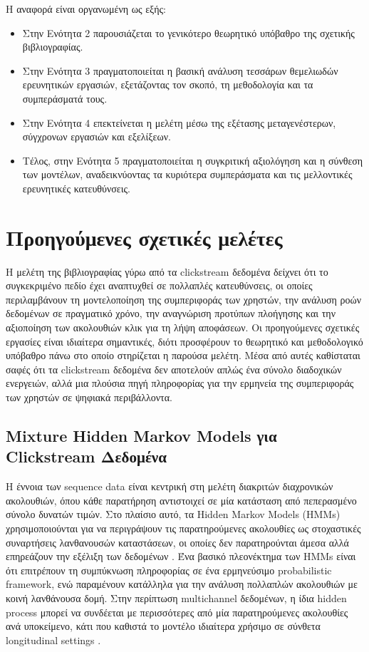\documentclass[12pt,a4paper]{article}
\begin{document}
    Η αναφορά είναι οργανωμένη ως εξής: 
    \begin{itemize}
    	\item Στην Ενότητα 2 παρουσιάζεται το γενικότερο θεωρητικό υπόβαθρο της σχετικής βιβλιογραφίας.
    	\item Στην Ενότητα 3 πραγματοποιείται η βασική ανάλυση τεσσάρων θεμελιωδών ερευνητικών εργασιών, εξετάζοντας τον σκοπό, τη μεθοδολογία και τα συμπεράσματά τους.
    	\item Στην Ενότητα 4 επεκτείνεται η μελέτη μέσω της εξέτασης μεταγενέστερων, σύγχρονων εργασιών και εξελίξεων.
    	\item Τέλος, στην Ενότητα 5 πραγματοποιείται η συγκριτική αξιολόγηση και η σύνθεση των μοντέλων, αναδεικνύοντας τα κυριότερα συμπεράσματα και τις μελλοντικές ερευνητικές κατευθύνσεις.
    \end{itemize}
	
	\section{Προηγούμενες σχετικές μελέτες}
	
	Η μελέτη της βιβλιογραφίας γύρω από τα clickstream δεδομένα δείχνει ότι το συγκεκριμένο πεδίο έχει αναπτυχθεί σε πολλαπλές κατευθύνσεις, οι οποίες περιλαμβάνουν τη μοντελοποίηση της συμπεριφοράς των χρηστών, την ανάλυση ροών δεδομένων σε πραγματικό χρόνο, την αναγνώριση προτύπων πλοήγησης και την αξιοποίηση των ακολουθιών κλικ για τη λήψη αποφάσεων. Οι προηγούμενες σχετικές εργασίες είναι ιδιαίτερα σημαντικές, διότι προσφέρουν το θεωρητικό και μεθοδολογικό υπόβαθρο πάνω στο οποίο στηρίζεται η παρούσα μελέτη. Μέσα από αυτές καθίσταται σαφές ότι τα clickstream δεδομένα δεν αποτελούν απλώς ένα σύνολο διαδοχικών ενεργειών, αλλά μια πλούσια πηγή πληροφορίας για την ερμηνεία της συμπεριφοράς των χρηστών σε ψηφιακά περιβάλλοντα.


	\subsection{Mixture Hidden Markov Models για Clickstream Δεδομένα}
	Η έννοια των sequence data είναι κεντρική στη μελέτη διακριτών διαχρονικών ακολουθιών, όπου κάθε παρατήρηση αντιστοιχεί σε μία κατάσταση από πεπερασμένο σύνολο δυνατών τιμών. Στο πλαίσιο αυτό, τα Hidden Markov Models (HMMs) χρησιμοποιούνται για να περιγράψουν τις παρατηρούμενες ακολουθίες ως στοχαστικές συναρτήσεις λανθανουσών καταστάσεων, οι οποίες δεν παρατηρούνται άμεσα αλλά επηρεάζουν την εξέλιξη των δεδομένων \cite{Helske2019}. Ένα βασικό πλεονέκτημα των HMMs είναι ότι επιτρέπουν τη συμπύκνωση πληροφορίας σε ένα ερμηνεύσιμο probabilistic framework, ενώ παραμένουν κατάλληλα για την ανάλυση πολλαπλών ακολουθιών με κοινή λανθάνουσα δομή. Στην περίπτωση multichannel δεδομένων, η ίδια hidden process μπορεί να συνδέεται με περισσότερες από μία παρατηρούμενες ακολουθίες ανά υποκείμενο, κάτι που καθιστά το μοντέλο ιδιαίτερα χρήσιμο σε σύνθετα longitudinal settings \cite{Helske2019}.
	
\end{document}
